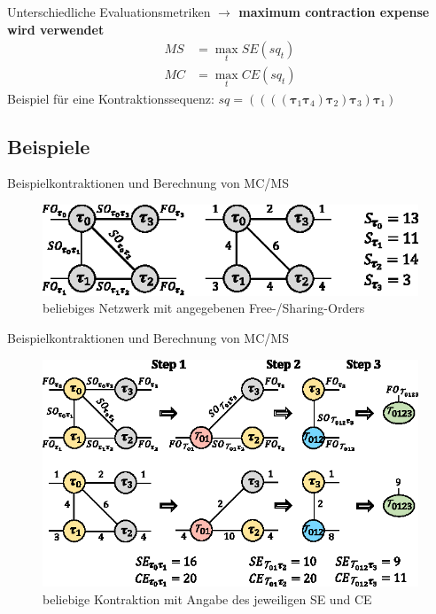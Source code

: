 \documentclass{beamer}
\newcommand{\tauB}{\bm{\tau}}
\begin{document}
\begin{frame}{Unterschiedliche Evaluationsmetriken}
	\textbf{$\rightarrow$ maximum contraction expense wird verwendet}
	\begin{align*}
		MS & = \max_t SE(sq_t) \\ MC &= \max_t CE(sq_t)
	\end{align*}
	Beispiel für eine Kontraktionssequenz:
	$sq = ((((\tauB_{1} \tauB_{4}) \tauB_{2}) \tauB_{3}) \tauB_{1})$
\end{frame}


\subsection{Beispiele}

\begin{frame}{Beispielkontraktionen und Berechnung von MC/MS}
	\begin{figure}
		\includegraphics{figure_03_a}
		\caption*{beliebiges Netzwerk mit angegebenen Free-/Sharing-Orders}
	\end{figure}
\end{frame}

\begin{frame}{Beispielkontraktionen und Berechnung von MC/MS}
	\begin{figure}
		\includegraphics{figure_03_b}
		\caption*{beliebige Kontraktion mit Angabe des jeweiligen SE und CE}
	\end{figure}
\end{frame}
\end{document}
